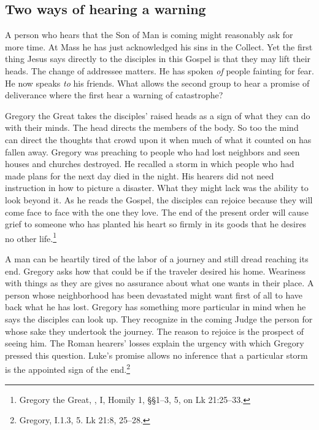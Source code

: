 
\subsection{Two ways of hearing a warning}

A person who hears that the Son of Man is coming might reasonably ask for more time. At Mass he has just acknowledged his sins in the Collect. Yet the first thing Jesus says directly to the disciples in this Gospel is that they may lift their heads. The change of addressee matters. He has spoken \emph{of} people fainting for fear. He now speaks \emph{to} his friends. What allows the second group to hear a promise of deliverance where the first hear a warning of catastrophe?

Gregory the Great takes the disciples' raised heads as a sign of what they can do with their minds. The head directs the members of the body. So too the mind can direct the thoughts that crowd upon it when much of what it counted on has fallen away. Gregory was preaching to people who had lost neighbors and seen houses and churches destroyed. He recalled a storm in which people who had made plans for the next day died in the night. His hearers did not need instruction in how to picture a disaster. What they might lack was the ability to look beyond it. As he reads the Gospel, the disciples can rejoice because they will come face to face with the one they love. The end of the present order will cause grief to someone who has planted his heart so firmly in its goods that he desires no other life.\footnote{Gregory the Great, , I, Homily 1, §§1--3, 5, on Lk 21:25--33.}

A man can be heartily tired of the labor of a journey and still dread reaching its end. Gregory asks how that could be if the traveler desired his home. Weariness with things as they are gives no assurance about what one wants in their place. A person whose neighborhood has been devastated might want first of all to have back what he has lost. Gregory has something more particular in mind when he says the disciples can look up. They recognize in the coming Judge the person for whose sake they undertook the journey. The reason to rejoice is the prospect of seeing him. The Roman hearers' losses explain the urgency with which Gregory pressed this question. Luke's promise allows no inference that a particular storm is the appointed sign of the end.\footnote{Gregory,  I.1.3, 5. Lk 21:8, 25--28.}

